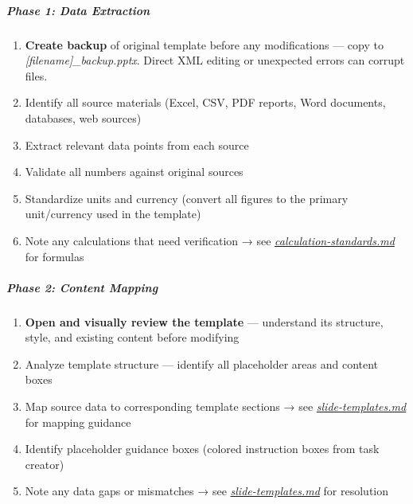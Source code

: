 \documentclass[11pt]{article}
\begin{document}
\subparagraph{Phase 1: Data Extraction}\mbox{}\par
\begin{enumerate}[leftmargin=*,itemsep=2pt,topsep=2pt]
\item {} \textbf{Create backup} of original template before any modifications — copy to \emph{[filename]\_\allowbreak{}backup.pptx}. Direct XML editing or unexpected errors can corrupt files.
\item {} Identify all source materials (Excel, CSV, PDF reports, Word documents, databases, web sources)
\item {} Extract relevant data points from each source
\item {} Validate all numbers against original sources
\item {} Standardize units and currency (convert all figures to the primary unit/currency used in the template)
\item {} Note any calculations that need verification → see \href{reference/calculation-standards.md}{\emph{calculation-standards.md}} for formulas
\end{enumerate}

\subparagraph{Phase 2: Content Mapping}\mbox{}\par
\begin{enumerate}[leftmargin=*,itemsep=2pt,topsep=2pt]
\item {} \textbf{Open and visually review the template} — understand its structure, style, and existing content before modifying
\item {} Analyze template structure — identify all placeholder areas and content boxes
\item {} Map source data to corresponding template sections → see \href{reference/slide-templates.md}{\emph{slide-templates.md}} for mapping guidance
\item {} Identify placeholder guidance boxes (colored instruction boxes from task creator)
\item {} Note any data gaps or mismatches → see \href{reference/slide-templates.md\#handling-data-template-mismatches}{\emph{slide-templates.md}} for resolution
\end{enumerate}
\end{document}
